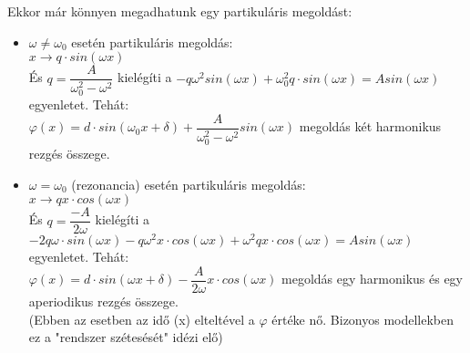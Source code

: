 \documentclass[margin=0px]{article}
\begin{document}
\begin{description}
        Ekkor már könnyen megadhatunk egy partikuláris megoldást:
        \begin{itemize}
            \item $\omega \neq \omega_0$ esetén partikuláris megoldás: \\
                  $ x \rightarrow q\cdot sin(\omega x) $\\
                  És $ q = \dfrac{A}{\omega_0^2-\omega^2} $ kielégíti a $-q\omega^2sin(\omega x)+\omega_0^2q\cdot sin(\omega x) = Asin(\omega x) $ egyenletet.
                  Tehát: \\
                  $ \varphi(x) = d\cdot sin(\omega_0x + \delta)+\dfrac{A}{\omega_0^2-\omega^2}sin(\omega x) $ megoldás két harmonikus rezgés összege.
            \item $ \omega = \omega_0 $ (rezonancia) esetén partikuláris megoldás: \\
                  $ x \rightarrow qx\cdot cos(\omega x) $\\
                  És $ q = \dfrac{-A}{2\omega} $ kielégíti a $-2q\omega \cdot sin(\omega x)- q\omega^2x\cdot cos(\omega x) +\omega^2qx\cdot cos(\omega x) = Asin(\omega x) $ egyenletet.
                  Tehát: \\
                  $ \varphi(x) = d\cdot sin(\omega x + \delta)-\dfrac{A}{2\omega}x\cdot cos(\omega x) $ megoldás egy harmonikus és egy aperiodikus rezgés összege.\\
                  (Ebben az esetben az idő (x) elteltével a $\varphi $ értéke nő. Bizonyos modellekben ez a "rendszer szétesését" idézi elő)
        \end{itemize}
\end{description}
\end{document}
